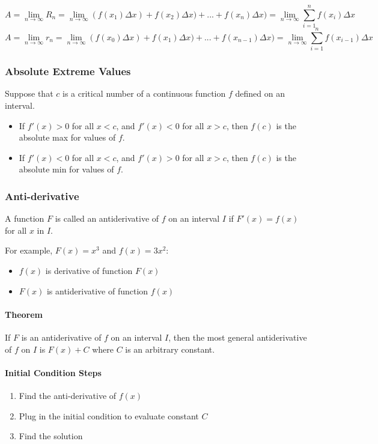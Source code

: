 \documentclass[12pt]{article}
\begin{document}
$$A=\lim_{n\to \infty} R_n = \lim_{n\to \infty} (f(x_1)\Delta x) + f(x_2)\Delta x) + ... + f(x_n)\Delta x) = \lim_{n\to \infty} \sum_{i=1}^{n} f(x_i)\Delta x$$
$$A=\lim_{n\to \infty} r_n = \lim_{n\to \infty} (f(x_0)\Delta x) + f(x_1)\Delta x) + ... + f(x_{n-1})\Delta x)= \lim_{n\to \infty} \sum_{i=1}^{n} f(x_{i-1})\Delta x$$

\subsubsection{Absolute Extreme Values} Suppose that $c$ is a critical number of a continuous function $f$ defined on an interval. 
\begin{itemize}
    \item If $f'(x)>0$ for all $x<c$, and $f'(x)<0$ for all $x>c$, then $f(c)$ is the absolute max for values of $f$.
    \item If $f'(x)<0$ for all $x<c$, and $f'(x)>0$ for all $x>c$, then $f(c)$ is the absolute min for values of $f$.
\end{itemize}

\subsubsection{Anti-derivative}
A function $F$ is called an antiderivative of $f$ on an interval $I$ if $F'(x) = f(x)$ for all $x$ in $I$.

\noindent For example, $F(x)=x^3$ and $f(x) = 3x^2$:
\begin{itemize}
    \item $f(x)$ is derivative of function $F(x)$
    \item $F(x)$ is antiderivative of function $f(x)$
\end{itemize}

\paragraph{Theorem} If $F$ is an antiderivative of $f$ on an interval $I$, then the most general antiderivative of $f$ on $I$ is $F(x)+C$ where $C$ is an arbitrary constant.

\paragraph{Initial Condition Steps}
\begin{enumerate}
    \item Find the anti-derivative of $f(x)$
    \item Plug in the initial  condition to evaluate constant $C$
    \item Find the solution
\end{enumerate}
\end{document}
